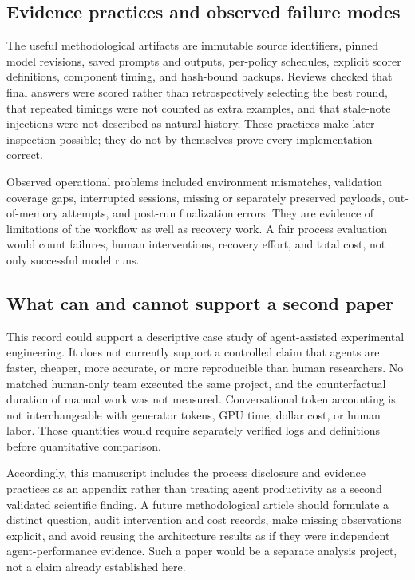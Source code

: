 \documentclass[11pt,letterpaper]{article}
\begin{document}
\subsection{Evidence practices and observed failure modes}
The useful methodological artifacts are immutable source identifiers, pinned model revisions, saved prompts and outputs, per-policy schedules, explicit scorer definitions, component timing, and hash-bound backups. Reviews checked that final answers were scored rather than retrospectively selecting the best round, that repeated timings were not counted as extra examples, and that stale-note injections were not described as natural history. These practices make later inspection possible; they do not by themselves prove every implementation correct.

Observed operational problems included environment mismatches, validation coverage gaps, interrupted sessions, missing or separately preserved payloads, out-of-memory attempts, and post-run finalization errors. They are evidence of limitations of the workflow as well as recovery work. A fair process evaluation would count failures, human interventions, recovery effort, and total cost, not only successful model runs.

\subsection{What can and cannot support a second paper}
This record could support a descriptive case study of agent-assisted experimental engineering. It does not currently support a controlled claim that agents are faster, cheaper, more accurate, or more reproducible than human researchers. No matched human-only team executed the same project, and the counterfactual duration of manual work was not measured. Conversational token accounting is not interchangeable with generator tokens, GPU time, dollar cost, or human labor. Those quantities would require separately verified logs and definitions before quantitative comparison.

Accordingly, this manuscript includes the process disclosure and evidence practices as an appendix rather than treating agent productivity as a second validated scientific finding. A future methodological article should formulate a distinct question, audit intervention and cost records, make missing observations explicit, and avoid reusing the architecture results as if they were independent agent-performance evidence. Such a paper would be a separate analysis project, not a claim already established here.
\end{document}
